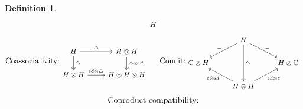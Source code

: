 \documentclass[12pt,a4paper]{article}
\newtheorem{definition}[theorem]{Definition}
\newcommand\1{_{(1)}}
\newcommand\2{_{(2)}}
\begin{document}
\begin{definition}
\[\begin{small}
\begin{tikzcd}
                                                           & H                                      &                                                          
\end{tikzcd}
\end{small}
\]
\[
\text{Coassociativity:} %
\begin{small}
\begin{tikzcd}
H \arrow[r, "\triangle"] \arrow[d, "\triangle"] & H\otimes H \arrow[d, "\triangle\otimes id"] \\
H\otimes H \arrow[r, "id\otimes\triangle"]               & H\otimes H\otimes H                        
\end{tikzcd}
\end{small}
\text{\;\;\;\; Counit:}
\begin{small}
\begin{tikzcd}
             & H \arrow[ld, "="'] \arrow[rd, "="] \arrow[dd, "\triangle"]                         &             \\
\mathbb{C}\otimes H &                                                                                    & H\otimes\mathbb{C} \\
             & H\otimes H \arrow[lu, "\varepsilon\otimes id"] \arrow[ru, "id\otimes\varepsilon"'] &            
\end{tikzcd}
\end{small}
\]
\vspace{4ex}
\[
\text{Coproduct compatibility:}
\begin{small}

\end{small}\]
\end{definition}
\end{document}
